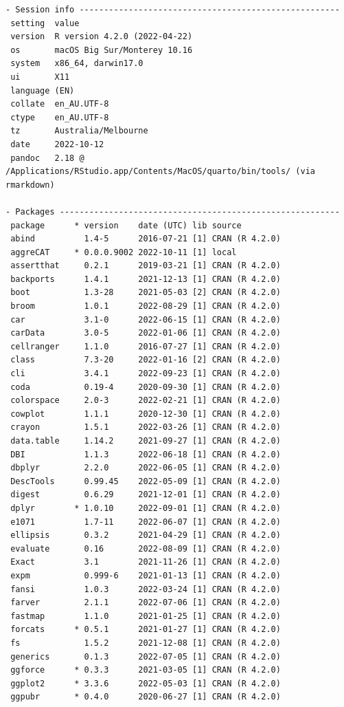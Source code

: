 \documentclass[article]{jss}
\begin{document}
\begin{verbatim}
- Session info -----------------------------------------------------
 setting  value
 version  R version 4.2.0 (2022-04-22)
 os       macOS Big Sur/Monterey 10.16
 system   x86_64, darwin17.0
 ui       X11
 language (EN)
 collate  en_AU.UTF-8
 ctype    en_AU.UTF-8
 tz       Australia/Melbourne
 date     2022-10-12
 pandoc   2.18 @ /Applications/RStudio.app/Contents/MacOS/quarto/bin/tools/ (via rmarkdown)

- Packages ---------------------------------------------------------
 package      * version    date (UTC) lib source
 abind          1.4-5      2016-07-21 [1] CRAN (R 4.2.0)
 aggreCAT     * 0.0.0.9002 2022-10-11 [1] local
 assertthat     0.2.1      2019-03-21 [1] CRAN (R 4.2.0)
 backports      1.4.1      2021-12-13 [1] CRAN (R 4.2.0)
 boot           1.3-28     2021-05-03 [2] CRAN (R 4.2.0)
 broom          1.0.1      2022-08-29 [1] CRAN (R 4.2.0)
 car            3.1-0      2022-06-15 [1] CRAN (R 4.2.0)
 carData        3.0-5      2022-01-06 [1] CRAN (R 4.2.0)
 cellranger     1.1.0      2016-07-27 [1] CRAN (R 4.2.0)
 class          7.3-20     2022-01-16 [2] CRAN (R 4.2.0)
 cli            3.4.1      2022-09-23 [1] CRAN (R 4.2.0)
 coda           0.19-4     2020-09-30 [1] CRAN (R 4.2.0)
 colorspace     2.0-3      2022-02-21 [1] CRAN (R 4.2.0)
 cowplot        1.1.1      2020-12-30 [1] CRAN (R 4.2.0)
 crayon         1.5.1      2022-03-26 [1] CRAN (R 4.2.0)
 data.table     1.14.2     2021-09-27 [1] CRAN (R 4.2.0)
 DBI            1.1.3      2022-06-18 [1] CRAN (R 4.2.0)
 dbplyr         2.2.0      2022-06-05 [1] CRAN (R 4.2.0)
 DescTools      0.99.45    2022-05-09 [1] CRAN (R 4.2.0)
 digest         0.6.29     2021-12-01 [1] CRAN (R 4.2.0)
 dplyr        * 1.0.10     2022-09-01 [1] CRAN (R 4.2.0)
 e1071          1.7-11     2022-06-07 [1] CRAN (R 4.2.0)
 ellipsis       0.3.2      2021-04-29 [1] CRAN (R 4.2.0)
 evaluate       0.16       2022-08-09 [1] CRAN (R 4.2.0)
 Exact          3.1        2021-11-26 [1] CRAN (R 4.2.0)
 expm           0.999-6    2021-01-13 [1] CRAN (R 4.2.0)
 fansi          1.0.3      2022-03-24 [1] CRAN (R 4.2.0)
 farver         2.1.1      2022-07-06 [1] CRAN (R 4.2.0)
 fastmap        1.1.0      2021-01-25 [1] CRAN (R 4.2.0)
 forcats      * 0.5.1      2021-01-27 [1] CRAN (R 4.2.0)
 fs             1.5.2      2021-12-08 [1] CRAN (R 4.2.0)
 generics       0.1.3      2022-07-05 [1] CRAN (R 4.2.0)
 ggforce      * 0.3.3      2021-03-05 [1] CRAN (R 4.2.0)
 ggplot2      * 3.3.6      2022-05-03 [1] CRAN (R 4.2.0)
 ggpubr       * 0.4.0      2020-06-27 [1] CRAN (R 4.2.0)

\end{verbatim}
\end{document}
